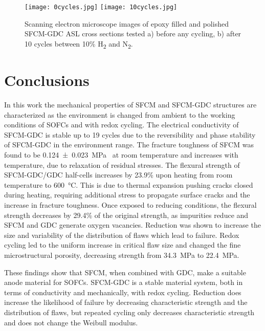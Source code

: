         \begin{figure}
          \texttt{[image: 0cycles.jpg]}
          \texttt{[image: 10cycles.jpg]}
          \caption{Scanning electron microscope images of epoxy filled and polished SFCM-GDC ASL  cross sections tested a) before any cycling, b) after 10 cycles between 10\% H\textsubscript{2} and N\textsubscript{2}.}
          \label{fig:cycledSEM}
        \end{figure}

\section{Conclusions}
    In this work the mechanical properties of SFCM and SFCM-GDC structures are characterized as the environment is changed from ambient to the working conditions of SOFCs and with redox cycling.
    The electrical conductivity of SFCM-GDC is stable up to 19 cycles due to the reversibility and phase stability of SFCM-GDC in the environment range.
    The fracture toughness of SFCM was found to be \SI[separate-uncertainty = true]{0.124 +- 0.023}{\mega\pascal{}} at room temperature and increases with temperature, due to relaxation of residual stresses.
    The flexural strength of SFCM-GDC/GDC half-cells increases by 23.9\% upon heating from room temperature to \SI{600}{\celsius}.
    This is due to thermal expansion pushing cracks closed during heating, requiring additional stress to propagate surface cracks and the increase in fracture toughness.
    Once exposed to reducing conditions, the flexural strength decreases by 29.4\% of the original strength, as impurities reduce and SFCM and GDC generate oxygen vacancies.
    Reduction was shown to increase the size and variability of the distribution of flaws which lead to failure.
    Redox cycling led to the uniform increase in critical flaw size and changed the fine microstructural porosity, decreasing strength from \SI{34.3}{\mega\pascal} to \SI{22.4}{\mega\pascal}.

    These findings show that SFCM, when combined with GDC, make a suitable anode material for SOFCs.
    SFCM-GDC is a stable material system, both in terms of conductivity and mechanically, with redox cycling.
    Reduction does increase the likelihood of failure by decreasing characteristic strength and the distribution of flaws, but repeated cycling only decreases characteristic strength and does not change the Weibull modulus.
